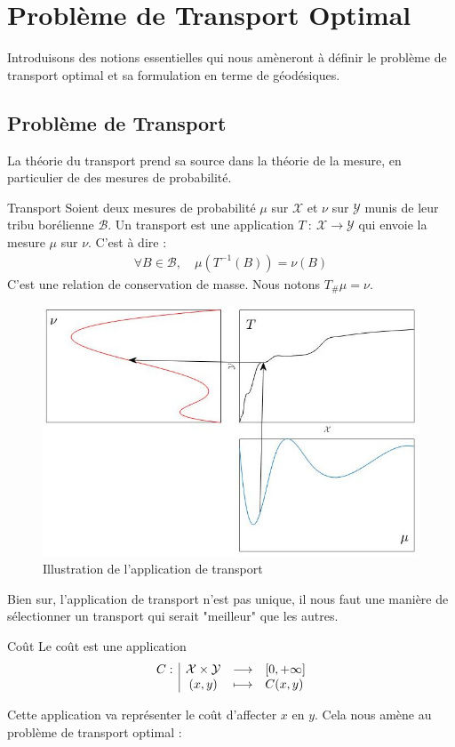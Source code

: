 \documentclass[a4paper,12pt]{article}
\begin{document}
\section{Problème de Transport Optimal}
Introduisons des notions essentielles qui nous amèneront à définir le problème de transport optimal et sa formulation en terme de géodésiques. 
\subsection{Problème de Transport}
La théorie du transport prend sa source dans la théorie de la mesure, en particulier de des mesures de probabilité. 
\begin{definition}{Transport}
Soient deux mesures de probabilité $\mu$ sur $\mathcal{X}$ et $\nu$ sur $\mathcal{Y}$ munis de leur tribu borélienne $\mathcal{B}$. Un transport est une application $T\ :\ \mathcal{X}\rightarrow\mathcal{Y}$ qui envoie la mesure $\mu$ sur $\nu$. C'est à dire : 
\begin{align}
\forall B\in\mathcal{B},\quad \mu(T^{-1}(B))=\nu(B)
\label{eq:trspmesures}
\end{align}
C'est une relation de conservation de masse. Nous notons $T_{\#}\mu=\nu$. 
\end{definition}
\begin{figure}[!h]
\centering
\includegraphics[width=0.8\linewidth]{img/transport.jpg}
\caption{Illustration de l'application de transport}
\end{figure}
Bien sur, l'application de transport n'est pas unique, il nous faut une manière de sélectionner un transport qui serait "meilleur" que les autres. 
\begin{definition}{Coût}
Le coût est une application 
$$
\begin{array}[t]{l|ccl} C: & \mathcal{X}\times\mathcal{Y} & \longrightarrow & [0,+\infty] \\ & (x,y) & \longmapsto & C(x,y) \end{array}
$$
\end{definition}
Cette application va représenter le coût d'affecter $x$ en $y$. Cela nous amène au problème de transport optimal : \\
\end{document}
